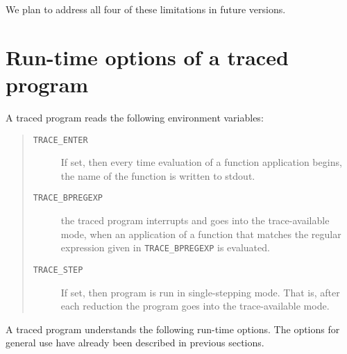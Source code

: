 \documentclass[12pt]{article}
\begin{document}
We plan to address all four of these limitations in future versions.


\appendix

\newpage
\section{Run-time options of a traced program}

\noindent
A traced program reads the following environment variables:
\begin{quote}
\begin{description}
\item[\texttt{TRACE\_ENTER}] 
If set, then every time evaluation of a function application begins, the name of the function is written to stdout.  

\item[\texttt{TRACE\_BPREGEXP}]
 the traced program interrupts and goes into the trace-available mode, when an application of a function that matches the regular expression given in \texttt{TRACE\_BPREGEXP} is evaluated.

\item[\texttt{TRACE\_STEP}] 
If set, then program is run in single-stepping mode. That is, after each reduction the program goes into the trace-available mode.
\end{description}
\end{quote}

A traced program understands the following run-time options.
The options for general use have already been described in previous sections.
\end{document}
